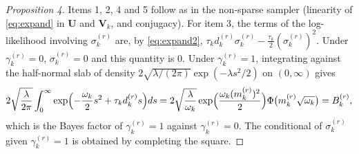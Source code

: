 \documentclass[11pt]{article}
\newcommand{\U}{\mathbf{U}}
\newcommand{\V}{\mathbf{V}}
\begin{document}
\begin{proof}[Proposition 4]
Items 1, 2, 4 and 5 follow as in the non-sparse sampler (linearity of \eqref{eq:expand} in $\U$ and $\V_k$, and
conjugacy). For item 3, the terms of the log-likelihood involving $\sigma_k^{(r)}$ are, by \eqref{eq:expand2},
$\tau_kd_k^{(r)}\sigma_k^{(r)}-\frac{\tau_k}{2}(\sigma_k^{(r)})^2$. Under $\gamma_k^{(r)}=0$, $\sigma_k^{(r)}=0$ and this quantity is
$0$. Under $\gamma_k^{(r)}=1$, integrating against the half-normal slab of density
$2\sqrt{\lambda/(2\pi)}\exp(-\lambda s^2/2)$ on $(0,\infty)$ gives
\[
  2\sqrt{\frac{\lambda}{2\pi}}\int_0^{\infty}\exp\Bigl(-\frac{\omega_k}{2}s^2+\tau_kd_k^{(r)}s\Bigr)ds
  =2\sqrt{\frac{\lambda}{\omega_k}}\exp\Bigl(\frac{\omega_k(m_k^{(r)})^2}{2}\Bigr)\Phi\bigl(m_k^{(r)}\sqrt{\omega_k}\bigr)=B_k^{(r)},
\]
which is the Bayes factor of $\gamma_k^{(r)}=1$ against $\gamma_k^{(r)}=0$. The conditional of $\sigma_k^{(r)}$ given
$\gamma_k^{(r)}=1$ is obtained by completing the square.
\end{proof}
\end{document}

